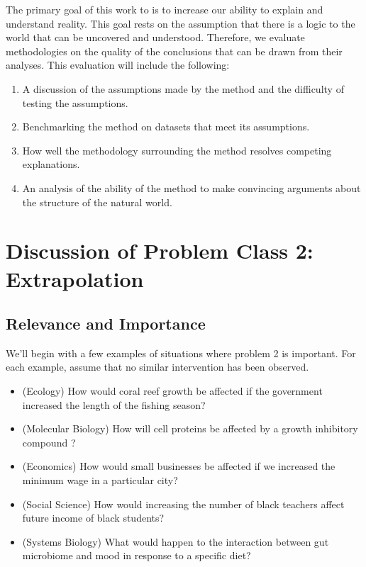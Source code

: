 \documentclass{article}
\begin{document}
        The primary goal of this work to is to increase our ability to explain and understand reality. This goal rests on the
        assumption that there is a logic to the world that can be uncovered and understood. Therefore, we evaluate methodologies
        on the quality of the conclusions that can be drawn from their analyses. This evaluation will include the following:

        \begin{enumerate}
            \item A discussion of the assumptions made by the method and the difficulty of testing the assumptions.
            \item Benchmarking the method on datasets that meet its assumptions.
            \item How well the methodology surrounding the method resolves competing explanations.
            \item An analysis of the ability of the method to make convincing arguments about the structure of the natural world.
        \end{enumerate}

\section*{Discussion of Problem Class 2: Extrapolation}

    \subsection*{Relevance and Importance}

        We'll begin with a few examples of situations where problem 2 is important. For each example, assume that no
        similar intervention has been observed.

        \begin{itemize}
            \item (Ecology) How would coral reef growth be affected if the government increased the length of the fishing season?
            \item (Molecular Biology) How will cell proteins be affected by a growth inhibitory compound \cite{dibernardo2005chemogenomic}? 
            \item (Economics) How would small businesses be affected if we increased the minimum wage in a particular city?
            \item (Social Science) How would increasing the number of black teachers affect future income of black students?
            \item (Systems Biology) What would happen to the interaction between gut microbiome and mood in response to a specific diet?
        \end{itemize}
\end{document}
